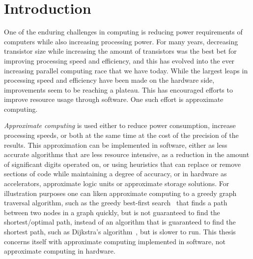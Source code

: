 \section{Introduction}

One of the enduring challenges in computing is reducing power requirements of computers while also increasing processing power. For many years, decreasing transistor size while increasing the amount of transistors was the best bet for improving processing speed and efficiency, and this has evolved into the ever increasing parallel computing race that we have today. While the largest leaps in processing speed and efficiency have been made on the hardware side, improvements seem to be reaching a plateau. This has encouraged efforts to improve resource usage through software. One such effort is approximate computing. 

\emph{Approximate computing} is used either to reduce power consumption, increase processing speeds, or both at the same time at the cost of the precision of the results. This approximation can be implemented in software, either as less accurate algorithms that are less resource intensive, as a reduction in the amount of significant digits operated on, or using heuristics that can replace or remove sections of code while maintaining a degree of accuracy, or in hardware as accelerators, approximate logic units or approximate storage solutions. For illustration purposes one can liken approximate computing to a greedy graph traversal algorithm, such as the greedy best-first search~\citep{coles2007marvin} that finds a path between two nodes in a graph quickly, but is not guaranteed to find the shortest/optimal path, instead of an algorithm that is guaranteed to find the shortest path, such as Dijkstra's algorithm~\citep{dijkstra1959note}, but is slower to run. This thesis concerns itself with approximate computing implemented in software, not approximate computing in hardware. 

